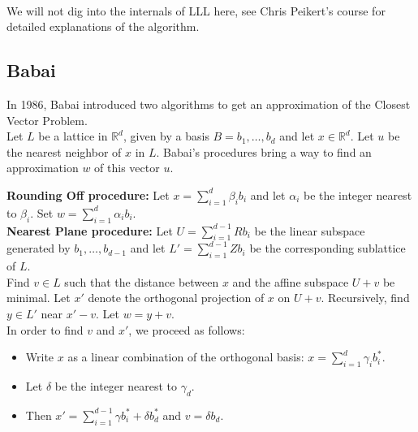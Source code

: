 \documentclass[a4paper,11pt]{article}
\begin{document}
\\

We will not dig into the internals of LLL here, see Chris Peikert's course\cite{chrispeikert} for detailed explanations of the algorithm.

\subsection{Babai}

In 1986, Babai introduced two algorithms\cite{babai} to get an approximation of the Closest Vector Problem.\\
Let $L$ be a lattice in $\mathbb{R}^d$, given by a basis $B = {b_1, \hdots, b_d}$ and let $x \in \mathbb{R}^d$. Let $u$ be the nearest neighbor of $x$ in $L$. Babai's procedures bring a way to find an approximation $w$ of this vector $u$.

\textbf{Rounding Off procedure:} Let $x = \sum^d_{i=1} \beta_i b_i$ and let $\alpha_i$ be the integer nearest to $\beta_i$. Set $w = \sum^d_{i=1} \alpha_i b_i$.\\

\textbf{Nearest Plane procedure:} Let $U = \sum^{d-1}_{i=1} R b_i$ be the linear subspace generated by $b_1, \hdots, b_{d-1}$ and let $L' = \sum^{d-1}_{i=1} Z b_i$ be the corresponding sublattice of $L$.\\
Find $v \in L$ such that the distance between $x$ and the affine subspace $U + v$ be minimal. Let $x'$ denote the orthogonal projection of $x$ on $U + v$. Recursively, find $y \in L'$ near $x' - v$. Let $w = y + v$.\\
In order to find $v$ and $x'$, we proceed as follows:
\begin{itemize}
\item Write $x$ as a linear combination of the orthogonal basis: $x = \sum^{d}_{i=1} \gamma_i b_i^{\ast}$.
\item Let $\delta$ be the integer nearest to $\gamma_d$.
\item Then $x' = \sum^{d-1}_{i=1} \gamma b_i^{\ast} + \delta b_d^{\ast}$ and $v = \delta b_d$.
\end{itemize}
\end{document}
